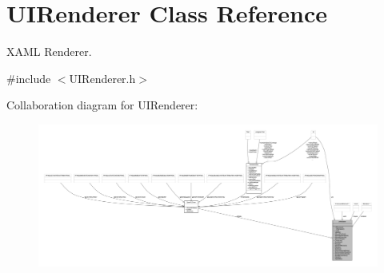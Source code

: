 \hypertarget{class_u_i_renderer}{\section{U\-I\-Renderer Class Reference}
\label{class_u_i_renderer}
}


X\-A\-M\-L Renderer.  




{\ttfamily \#include $<$U\-I\-Renderer.\-h$>$}



Collaboration diagram for U\-I\-Renderer\-:
\nopagebreak
\begin{figure}[H]
\begin{center}
\leavevmode
\includegraphics[width=350pt]{class_u_i_renderer__coll__graph}
\end{center}
\end{figure}
